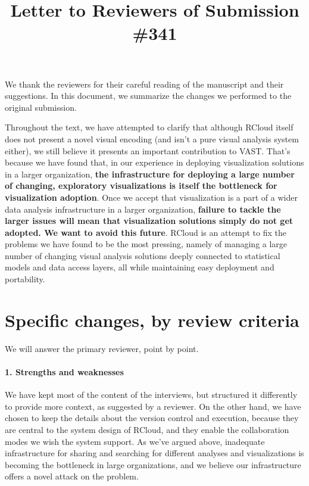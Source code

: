 \documentclass{article}
\title{Letter to Reviewers of Submission \#341}
\begin{document}
\maketitle

We thank the reviewers for their careful reading of the manuscript and
their suggestions. In this document, we summarize the changes we
performed to the original submission.

Throughout the text, we have attempted to clarify that although RCloud
itself does not present a novel visual encoding (and isn't a pure
visual analysis system either), we still believe it presents an
important contribution to VAST. That's because we have found that, in
our experience in deploying visualization solutions in a larger
organization, \textbf{the infrastructure for deploying a large number of
  changing, exploratory visualizations is itself the bottleneck for
  visualization adoption}. Once we accept that visualization is a part
of a wider data analysis infrastructure in a larger organization,
\textbf{failure to tackle the larger issues will mean that visualization
solutions simply do not get adopted. We want to avoid this future}.
RCloud is an attempt to fix the problems we have found to be the most
pressing, namely of managing a large number of changing visual
analysis solutions deeply connected to statistical models and data
access layers, all while maintaining easy deployment and portability.

\section*{Specific changes, by review criteria}

We will answer the primary reviewer, point by point.

\paragraph*{1. Strengths and weaknesses}
We have kept most of the content of the interviews, but structured it
differently to provide more context, as suggested by a reviewer. On
the other hand, we have chosen to keep the details about the version
control and execution, because they are central to the system design
of RCloud, and they enable the collaboration modes we wish the system
support. As we've argued above, inadequate infrastructure for sharing
and searching for different analyses and visualizations is becoming
the bottleneck in large organizations, and we believe our
infrastructure offers a novel attack on the problem.
\end{document}
